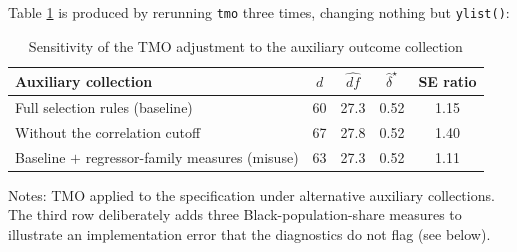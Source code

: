 \documentclass[varwidth,bib]{statapress}
\begin{document}
Table \ref{tab:bernylist} is produced by rerunning {\tt tmo} three times, changing nothing but {\tt ylist()}:

\begin{stlog}

\end{stlog}

\begin{table}[H]
\centering
\caption{Sensitivity of the TMO adjustment to the auxiliary outcome collection}
\label{tab:bernylist}
\begin{threeparttable}
\begin{tabular}{lcccc}
\toprule
Auxiliary collection & $d$ & $\widehat{df}$ & $\hat\delta^\star$ & SE ratio \\
\midrule
Full selection rules (baseline)                   & 60 & 27.3 & 0.52 & 1.15 \\
Without the correlation cutoff                    & 67 & 27.8 & 0.52 & 1.40 \\
Baseline $+$ regressor-family measures (misuse)   & 63 & 27.3 & 0.52 & 1.11 \\
\bottomrule
\end{tabular}
\begin{tablenotes}[flushleft]
\setlength{}\scriptsize
\item Notes: TMO applied to the \citet{Berninietal2023} specification under alternative auxiliary collections.  The third row deliberately adds three Black-population-share measures to illustrate an implementation error that the diagnostics do not flag (see below).
\end{tablenotes}
\end{threeparttable}
\end{table}
\end{document}
